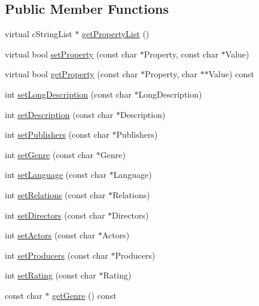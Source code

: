 \subsection*{Public Member Functions}
\begin{CompactItemize}
\item 
virtual cStringList $\ast$ \hyperlink{classcUPnPClassVideoItem_9dc397419b45535a3e6a676667b619a4}{getPropertyList} ()
\item 
virtual bool \hyperlink{classcUPnPClassVideoItem_3cbda6d87f5a9ff0475a75e76ba19924}{setProperty} (const char $\ast$Property, const char $\ast$Value)
\item 
virtual bool \hyperlink{classcUPnPClassVideoItem_94ab2ffcbe14abb63c680e6748e70ef1}{getProperty} (const char $\ast$Property, char $\ast$$\ast$Value) const 
\item 
int \hyperlink{classcUPnPClassVideoItem_05c5b8394cbfcaeffe5f99c885496e3d}{setLongDescription} (const char $\ast$LongDescription)
\item 
int \hyperlink{classcUPnPClassVideoItem_f5a642732c66b6920f5b4646a4c34a92}{setDescription} (const char $\ast$Description)
\item 
int \hyperlink{classcUPnPClassVideoItem_db14c0944a89f179832a4f4914caa4ca}{setPublishers} (const char $\ast$Publishers)
\item 
int \hyperlink{classcUPnPClassVideoItem_1be14ea33f9bbf53e636fea3658cc6f8}{setGenre} (const char $\ast$Genre)
\item 
int \hyperlink{classcUPnPClassVideoItem_89c24d198ce7bdc31aac727e65b02a84}{setLanguage} (const char $\ast$Language)
\item 
int \hyperlink{classcUPnPClassVideoItem_844385c5fb4f55c95a2994c7aaf120ef}{setRelations} (const char $\ast$Relations)
\item 
int \hyperlink{classcUPnPClassVideoItem_a5fc1a420bfd307bbd026c0681162e0a}{setDirectors} (const char $\ast$Directors)
\item 
int \hyperlink{classcUPnPClassVideoItem_33b104046098dbf66d894143181678c4}{setActors} (const char $\ast$Actors)
\item 
int \hyperlink{classcUPnPClassVideoItem_3812b8056c9d2c7d13a7734e4219b27b}{setProducers} (const char $\ast$Producers)
\item 
int \hyperlink{classcUPnPClassVideoItem_6d4143016fc91fcbb0db4e9f8a8a0047}{setRating} (const char $\ast$Rating)
\item 
const char $\ast$ \hyperlink{classcUPnPClassVideoItem_b3ca922f5605d81bd8d3457fa19e228d}{getGenre} () const 
$$
\end{CompactItemize}
